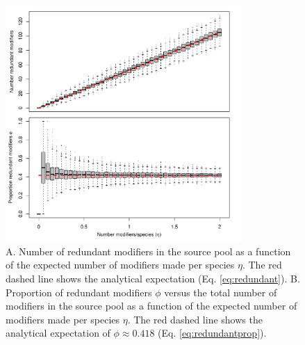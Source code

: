 \documentclass[9pt,twocolumn,twoside]{pnas-new}
\begin{document}
\begin{figure}[h!]
\centering
\includegraphics[width=0.8\textwidth]{fig_redundancy.pdf}
\caption{
A. Number of redundant modifiers in the source pool as a function of the expected number of modifiers made per species $\eta$.
The red dashed line shows the analytical expectation (Eq. \ref{eq:redundant}).
B. Proportion of redundant modifiers $\phi$ versus the total number of modifiers in the source pool as a function of the expected number of modifiers made per species $\eta$.
The red dashed line shows the analytical expectation of $\phi \approx 0.418$ (Eq. \ref{eq:redundantprop}).
}
\label{fig:redundancy}
\end{figure}
\end{document}
